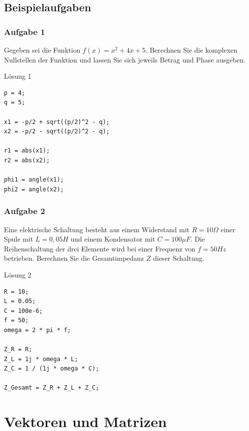 \documentclass[12pt, a4paper, twoside]{article}
\begin{document}
        \subsection{Beispielaufgaben}
                \subsubsection*{Aufgabe 1}
                Gegeben sei die Funktion $f(x) = x^2 +4x +5$. Berechnen Sie die komplexen Nullstellen der Funktion und lassen Sie sich jeweils Betrag und Phase ausgeben.
                \begin{Codelösung}{Lösung 1}
                    \begin{lstlisting}
p = 4;
q = 5;

x1 = -p/2 + sqrt((p/2)^2 - q);
x2 = -p/2 - sqrt((p/2)^2 - q);

r1 = abs(x1);
r2 = abs(x2);

phi1 = angle(x1);
phi2 = angle(x2);
                    \end{lstlisting}
                    
                \end{Codelösung}


                \subsubsection*{Aufgabe 2}
                Eine elektrische Schaltung besteht aus einem Widerstand mit $R=10\Omega$ einer Spule mit $L=0,05H$ und einem Kondensator mit $C=100\mu F$. Die Reihenschaltung der drei Elemente wird bei einer Frequenz von $f=50Hz$ betrieben. Berechnen Sie die Gesamtimpedanz $Z$ dieser Schaltung.
                \begin{Codelösung}{Lösung 2}
                    \begin{lstlisting}
R = 10;
L = 0.05;
C = 100e-6;
f = 50;
omega = 2 * pi * f;

Z_R = R;
Z_L = 1j * omega * L;
Z_C = 1 / (1j * omega * C);

Z_Gesamt = Z_R + Z_L + Z_C;
                    \end{lstlisting}   
                \end{Codelösung}
                
    \section{Vektoren und Matrizen}
\end{document}
